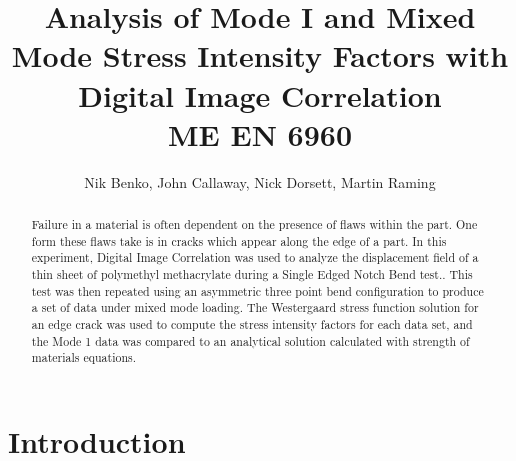 \documentclass[12pt]{article}
\begin{document}
\title{ Analysis of Mode I and Mixed Mode Stress Intensity Factors with Digital Image Correlation \\ \normalsize{ME EN 6960}}
\author{Nik Benko, John Callaway, Nick Dorsett, Martin Raming}
\maketitle


\begin{abstract} 
	Failure in a material is often dependent on the presence of flaws within the part. One form these flaws take is in cracks which appear along the edge of a part. In this experiment, Digital Image Correlation was used to analyze the displacement field of a thin sheet of polymethyl methacrylate during a Single Edged Notch Bend test.. This test was then repeated using an asymmetric three point bend configuration to produce a set of data under mixed mode loading. The Westergaard stress function solution for an edge crack was used to compute the stress intensity factors for each data set, and the Mode 1 data was compared to an analytical solution calculated with strength of materials equations. 
\end{abstract}

\section{Introduction} %
\end{document}
